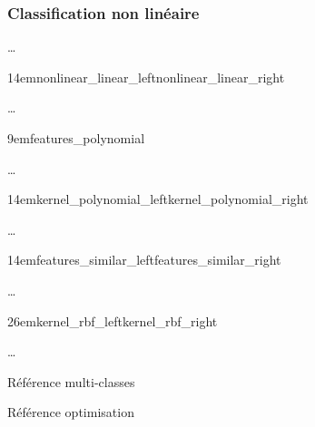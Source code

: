 \subsubsection{Classification non linéaire}

…

{14em}{nonlinear_linear_left}{nonlinear_linear_right}

…

{9em}{features_polynomial}

…

{14em}{kernel_polynomial_left}{kernel_polynomial_right}

…

{14em}{features_similar_left}{features_similar_right}

…

{26em}{kernel_rbf_left}{kernel_rbf_right}

…

Référence multi-classes \cite{multi-class}

Référence optimisation \cite{mri} \cite{optimization}

\pagebreak

